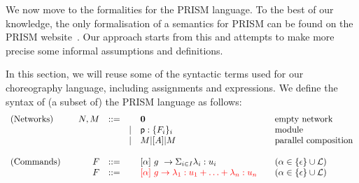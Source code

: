 We now move to the formalities for the PRISM language. To the best of
our knowledge, the only formalisation of a semantics for PRISM can be
found on the PRISM website~\cite{prismemantics}. Our approach starts
from this and attempts to make more precise some informal assumptions
and definitions.

\smallskip

 In this section, we will reuse some of the syntactic
terms used for our choreography language, including assignments and
expressions. We define the syntax of (a subset of) the PRISM language
as follows:
\begin{displaymath}
  \begin{array}{lrlll@{\qquad}l}
    \text{(Networks)}  \quad
    & N, M  & ::=  &      & \CEnd & \text{empty network}\\
    &       &      & \mid & \role{p}:\{F_i\}_i & \text{module}\\
    &       &      & \mid & M \ppp A M & \text{parallel composition}\\
    \\
    \text{(Commands)}  \quad
    & F     & ::=  &      & \command \alpha g\lambda u
                                  & \text{} (\alpha\in\{\epsilon\}\cup\mathcal L) \\
    & F     & ::=  &      & \textcolor{red}{[\alpha]\ g \rightarrow \lambda_1 : u_1 + \ldots + \lambda_n : u_n}
    & \text{} (\alpha\in\{\epsilon\}\cup\mathcal L) \\
  \end{array}
\end{displaymath}

